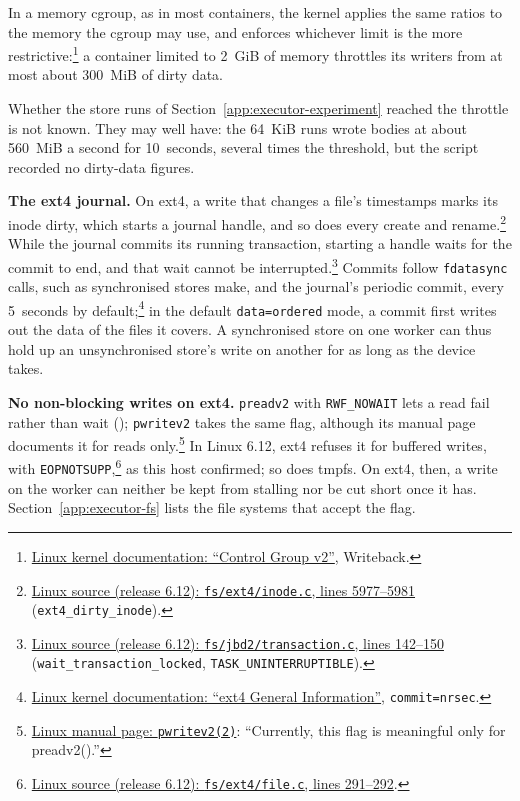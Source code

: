 In a memory cgroup, as in most containers, the kernel applies the same
ratios to the memory the cgroup may use, and enforces whichever limit is the
more
restrictive:\footnote{\href{https://www.kernel.org/doc/html/latest/admin-guide/cgroup-v2.html\#writeback}{Linux
kernel documentation: ``Control Group v2''}, Writeback.} a container limited
to 2~GiB of memory throttles its writers from at most about 300~MiB of dirty
data.

Whether the store runs of Section~\ref{app:executor-experiment} reached the
throttle is not known. They may well have: the 64~KiB runs wrote bodies at
about 560~MiB a second for 10~seconds, several times the threshold, but the
script recorded no dirty-data figures.

\textbf{The ext4 journal.} On ext4, a write that changes a file's timestamps
marks its inode dirty, which starts a journal handle, and so does every
create and
rename.\footnote{\href{https://github.com/torvalds/linux/blob/v6.12/fs/ext4/inode.c\#L5977-L5981}{Linux
source (release 6.12): \texttt{fs/ext4/inode.c}, lines 5977--5981}
(\texttt{ext4\_dirty\_inode}).} While the journal commits its running
transaction, starting a handle waits for the commit to end, and that wait
cannot be
interrupted.\footnote{\href{https://github.com/torvalds/linux/blob/v6.12/fs/jbd2/transaction.c\#L142-L150}{Linux
source (release 6.12): \texttt{fs/jbd2/transaction.c}, lines 142--150}
(\texttt{wait\_transaction\_locked}, \texttt{TASK\_UNINTERRUPTIBLE}).}
Commits follow \texttt{fdatasync} calls, such as synchronised stores make,
and the journal's periodic commit, every 5~seconds by
default;\footnote{\href{https://www.kernel.org/doc/html/latest/admin-guide/ext4.html}{Linux
kernel documentation: ``ext4 General Information''},
\texttt{commit=nrsec}.} in the default \texttt{data=ordered} mode, a commit
first writes out the data of the files it covers. A synchronised store on
one worker can thus hold up an unsynchronised store's write on another for
as long as the device takes.

\textbf{No non-blocking writes on ext4.} \texttt{preadv2} with
\texttt{RWF\_NOWAIT} lets a read fail rather than wait
(); \texttt{pwritev2} takes the same flag,
although its manual page documents it for reads
only.\footnote{\href{https://man7.org/linux/man-pages/man2/pwritev2.2.html}{Linux
manual page: \texttt{pwritev2(2)}}: ``Currently, this flag is meaningful
only for preadv2().''} In Linux 6.12, ext4 refuses it for buffered writes,
with
\texttt{EOPNOTSUPP},\footnote{\href{https://github.com/torvalds/linux/blob/v6.12/fs/ext4/file.c\#L291-L292}{Linux
source (release 6.12): \texttt{fs/ext4/file.c}, lines 291--292}.} as this host
confirmed; so does tmpfs. On ext4, then, a write on the worker can neither
be kept from stalling nor be cut short once it has.
Section~\ref{app:executor-fs} lists the file systems that accept the flag.

